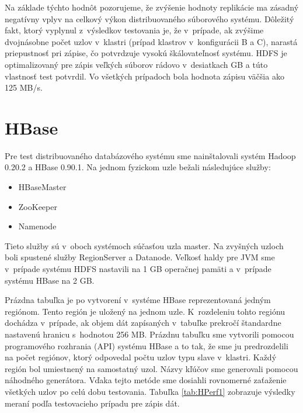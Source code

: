 \documentclass[11pt,twoside,a4paper]{book}
\begin{document}
% 
% 

Na základe týchto hodnôt pozorujeme, že zvýšenie hodnoty replikácie ma zásadný negatívny vplyv na celkový výkon distribuovaného súborového systému. Dôležitý fakt, ktorý vyplynul z~výsledkov testovania je, že v~prípade, ak zvýšime dvojnásobne počet uzlov v~klastri (prípad klastrov v~konfigurácii B a C), narastá priepustnosť pri zápise, čo potvrdzuje vysokú škálovateľnosť systému. HDFS je optimalizovaný pre zápis veľkých súborov rádovo v~desiatkach GB a túto vlastnosť test potvrdil. Vo všetkých prípadoch bola hodnota zápisu väčšia ako 125 MB/s. 


\section{HBase}

Pre test distribuovaného databázového systému sme nainštalovali systém Hadoop 0.20.2 a HBase 0.90.1. Na jednom fyzickom uzle bežali následujúce služby:

\begin{itemize}
 \item HBaseMaster
 \item ZooKeeper
 \item Namenode 
\end{itemize}

Tieto služby sú v~oboch systémoch súčasťou uzla master. Na zvyšných uzloch boli spustené služby RegionServer a Datanode. Veľkosť haldy pre JVM sme v~prípade systému HDFS nastavili na 1 GB operačnej pamäti a v~prípade systému HBase na 2 GB.

Prázdna tabuľka je po vytvorení v~systéme HBase reprezentovaná  jedným regiónom. Tento región je uložený na jednom uzle. K~rozdeleniu tohto regiónu dochádza v~prípade, ak objem dát zapísaných v~tabuľke prekročí štandardne nastavenú hranicu s~hodnotou 256 MB. Prázdnu tabuľku sme vytvorili pomocou programového rozhrania (API) systému HBase a to tak, že sme ju predrozdelili na počet regiónov, ktorý odpovedal počtu uzlov typu slave v~klastri. Každý región bol umiestnený na samostatný uzol. Názvy kľúčov sme generovali pomocou náhodného generátora. Vďaka tejto metóde sme dosiahli rovnomerné zaťaženie všetkých uzlov po celú dobu testovania. Tabuľka \ref{tab:HPerf1} zobrazuje výsledky meraní podľa testovacieho prípadu pre zápis dát. 
\end{document}
